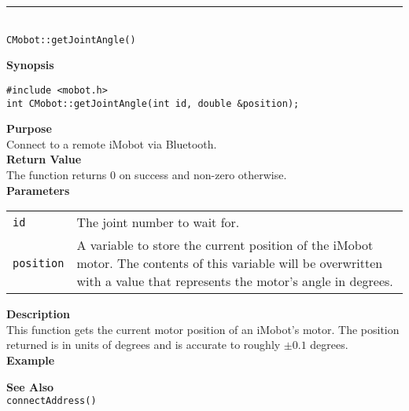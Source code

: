 \noindent
\vspace{5pt}
\rule{4.5in}{0.015in}\\
\noindent
{\LARGE \texttt{CMobot::getJointAngle()}}\\
{}

\noindent
{\bf Synopsis}\\
\begin{verbatim}
#include <mobot.h>
int CMobot::getJointAngle(int id, double &position);
\end{verbatim}

\noindent
{\bf Purpose}\\
Connect to a remote iMobot via Bluetooth.\\

\noindent
{\bf Return Value}\\
The function returns 0 on success and non-zero otherwise.\\

\noindent
{\bf Parameters}\\
\vspace{-0.1in}
\begin{description}
\item               
\begin{tabular}{p{10 mm}p{145 mm}}
\texttt{id} & The joint number to wait for. \\
\texttt{position} & A variable to store the current position of the iMobot
motor. The contents of this variable will be overwritten with a value that
represents the motor's angle in degrees.  \\
\end{tabular}
\end{description}

\noindent
{\bf Description}\\
This function gets the current motor position of an iMobot's motor. The
position returned is in units of degrees and is accurate to roughly $\pm0.1$
degrees. \\

\noindent
{\bf Example}\\
\noindent

\noindent
{\bf See Also}\\
\texttt{connectAddress()}

